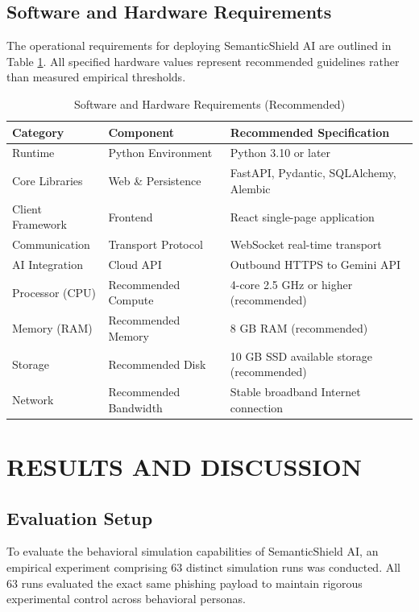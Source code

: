 \documentclass[conference,letterpaper]{IEEEtran}
\begin{document}
\subsection{Software and Hardware Requirements}
The operational requirements for deploying SemanticShield AI are outlined in Table \ref{tab:requirements}. All specified hardware values represent recommended guidelines rather than measured empirical thresholds.

\begin{table}[t]
\caption{Software and Hardware Requirements (Recommended)}
\label{tab:requirements}
\centering
\renewcommand{\arraystretch}{0.90}
\begin{tabularx}{\columnwidth}{lp{2.6cm}X}
\toprule
\textbf{Category} & \textbf{Component} & \textbf{Recommended Specification} \\
\midrule
Runtime & Python Environment & Python 3.10 or later \\
Core Libraries & Web \& Persistence & FastAPI, Pydantic, SQLAlchemy, Alembic \\
Client Framework & Frontend & React single-page application \\
Communication & Transport Protocol & WebSocket real-time transport \\
AI Integration & Cloud API & Outbound HTTPS to Gemini API \\
Processor (CPU) & Recommended Compute & 4-core 2.5 GHz or higher (recommended) \\
Memory (RAM) & Recommended Memory & 8 GB RAM (recommended) \\
Storage & Recommended Disk & 10 GB SSD available storage (recommended) \\
Network & Recommended Bandwidth & Stable broadband Internet connection \\
\bottomrule
\end{tabularx}
\end{table}

\section{RESULTS AND DISCUSSION}

\subsection{Evaluation Setup}
To evaluate the behavioral simulation capabilities of SemanticShield AI, an empirical experiment comprising 63 distinct simulation runs was conducted. All 63 runs evaluated the exact same phishing payload to maintain rigorous experimental control across behavioral personas.
\end{document}
